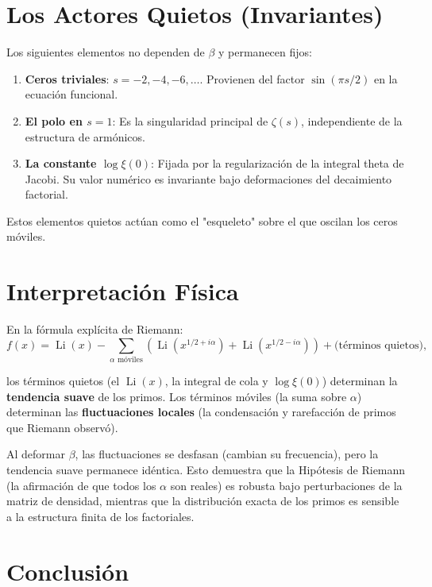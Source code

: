 \documentclass[12pt,a4paper]{article}
\begin{document}
\section{Los Actores Quietos (Invariantes)}

Los siguientes elementos no dependen de \(\beta\) y permanecen fijos:

\begin{enumerate}
\item \textbf{Ceros triviales}: \(s = -2, -4, -6, \dots\). Provienen del factor \(\sin(\pi s/2)\) en la ecuación funcional.
\item \textbf{El polo en \(s = 1\)}: Es la singularidad principal de \(\zeta(s)\), independiente de la estructura de armónicos.
\item \textbf{La constante \(\log \xi(0)\)}: Fijada por la regularización de la integral theta de Jacobi. Su valor numérico es invariante bajo deformaciones del decaimiento factorial.
\end{enumerate}

Estos elementos quietos actúan como el "esqueleto" sobre el que oscilan los ceros móviles.

\section{Interpretación Física}

En la fórmula explícita de Riemann:
\[
f(x) = \operatorname{Li}(x) - \sum_{\alpha \text{ móviles}} \left( \operatorname{Li}(x^{1/2 + i\alpha}) + \operatorname{Li}(x^{1/2 - i\alpha}) \right) + \text{(términos quietos)},
\]

los términos quietos (el \(\operatorname{Li}(x)\), la integral de cola y \(\log \xi(0)\)) determinan la \textbf{tendencia suave} de los primos. Los términos móviles (la suma sobre \(\alpha\)) determinan las \textbf{fluctuaciones locales} (la condensación y rarefacción de primos que Riemann observó).

Al deformar \(\beta\), las fluctuaciones se desfasan (cambian su frecuencia), pero la tendencia suave permanece idéntica. Esto demuestra que la Hipótesis de Riemann (la afirmación de que todos los \(\alpha\) son reales) es robusta bajo perturbaciones de la matriz de densidad, mientras que la distribución exacta de los primos es sensible a la estructura finita de los factoriales.

\section{Conclusión}
\end{document}
